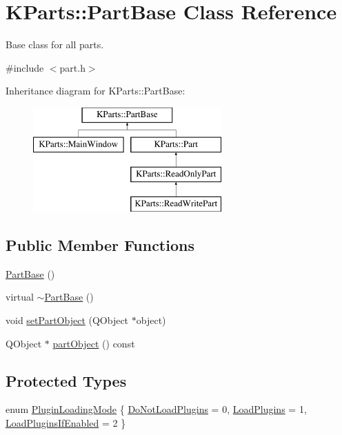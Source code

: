 \hypertarget{classKParts_1_1PartBase}{\section{\-K\-Parts\-:\-:\-Part\-Base \-Class \-Reference}
\label{classKParts_1_1PartBase}
}


\-Base class for all parts.  




{\ttfamily \#include $<$part.\-h$>$}

\-Inheritance diagram for \-K\-Parts\-:\-:\-Part\-Base\-:\begin{figure}[H]
\begin{center}
\leavevmode
\includegraphics[height=4.000000cm]{classKParts_1_1PartBase}
\end{center}
\end{figure}
\subsection*{\-Public \-Member \-Functions}
\begin{DoxyCompactItemize}
\item 
\hyperlink{classKParts_1_1PartBase_a24a84cc28a2f2c351d39c4128f2952a0}{\-Part\-Base} ()
\item 
virtual \hyperlink{classKParts_1_1PartBase_a0753290f4dd3c2886425e37594939ea8}{$\sim$\-Part\-Base} ()
\item 
void \hyperlink{classKParts_1_1PartBase_aea74884035b19b8909c3163ad6afd444}{set\-Part\-Object} (\-Q\-Object $\ast$object)
\item 
\-Q\-Object $\ast$ \hyperlink{classKParts_1_1PartBase_a259f6a9c7258d1a623b56782391ac7e6}{part\-Object} () const 
\end{DoxyCompactItemize}
\subsection*{\-Protected \-Types}
\begin{DoxyCompactItemize}
\item 
enum \hyperlink{classKParts_1_1PartBase_a73b04eba759c3505ac722b2ceaaa8b76}{\-Plugin\-Loading\-Mode} \{ \hyperlink{classKParts_1_1PartBase_a73b04eba759c3505ac722b2ceaaa8b76a3ffe0a5005d5e1d00b4d3fd8c4d51a1e}{\-Do\-Not\-Load\-Plugins} =  0, 
\hyperlink{classKParts_1_1PartBase_a73b04eba759c3505ac722b2ceaaa8b76aeff505f5627f1539e03730d042e39522}{\-Load\-Plugins} =  1, 
\hyperlink{classKParts_1_1PartBase_a73b04eba759c3505ac722b2ceaaa8b76aeaf6ca999ef635e22e3f52234226e931}{\-Load\-Plugins\-If\-Enabled} =  2
 \}
\end{DoxyCompactItemize}

